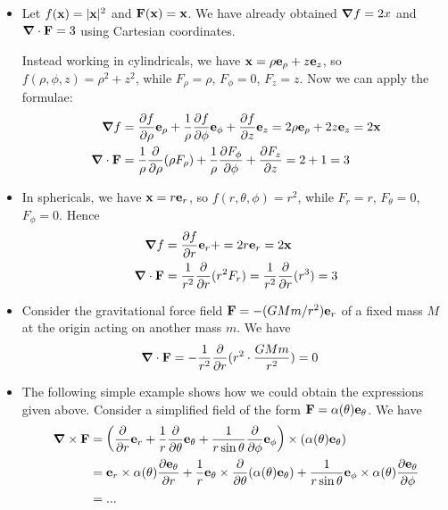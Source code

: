 \documentclass{../../template/note}
\begin{document}
    \begin{example*}
        \begin{itemize}
            \item Let \(f(\V x) = |\V x|^2\) and \(\V F(\V x) = \V x\). We have already obtained \(\grad f = 2x\) and \(\div \V F = 3\) using Cartesian coordinates.
            
            Instead working in cylindricals, we have \(\V x = \rho \V e_\rho + z \V e_z\), so \(f(\rho, \phi, z) = \rho^2 + z^2\), while \(F_\rho = \rho\), \(F_\phi = 0\), \(F_z = z\). Now we can apply the formulae:
            \begin{align*}
                \grad f &= \pd f \rho \V e_\rho + \frac 1 \rho \pd f \phi \V e_\phi + \pd f z \V e_z = 2\rho \V e_\rho + 2z \V e_z = 2\V x \\
                \div \V F &= \frac 1 \rho \pd{}\rho(\rho F_\rho) + \frac 1 \rho \pd{F_\phi}{\phi} + \pd{F_z}{z} = 2 + 1 = 3
            \end{align*}
            \item In sphericals, we have \(\V x = r \V e_r\), so \(f(r, \theta, \phi) = r^2\), while \(F_r = r\), \(F_\theta = 0\), \(F_\phi = 0\). Hence
            \begin{align*}
                \grad f &= \pd{f}{r} \V e_r + = 2r \V e_r = 2 \V x \\
                \div \V F &= \frac 1 {r^2} \pd{} r (r^2F_r) = \frac 1 {r^2} \pd{} r (r^3) = 3
            \end{align*}
            \item Consider the gravitational force field \(\V F = -(GMm/r^2)\V e_r\) of a fixed mass \(M\) at the origin acting on another mass \(m\). We have
            \begin{align*}
                \div \V F = -\frac 1 {r^2} \pd{} r (r^2 \cdot \frac{GMm}{r^2}) &= 0 
            \end{align*}
            \item The following simple example shows how we could obtain the expressions given above. Consider a simplified field of the form \(\V F = \alpha(\theta) \V e_\theta\). We have
            \begin{align*}
                \curl \V F &= \left(\pd{}{r} \V e_r + \frac 1 r \pd{}{\theta} \V e_\theta + \frac 1{r \sin \theta} \pd {} \phi \V e_\phi\right) \times (\alpha(\theta)\V e_\theta) \\
                &= \V e_r \times \alpha(\theta) \pd{\V e_\theta}{r} + \frac 1 r \V e_\theta \times \pd{} \theta (\alpha(\theta) \V e_\theta) + \frac 1 {r \sin \theta} \V e_\phi \times \alpha(\theta) \pd{\V e_\theta}{\phi} \\
                &= ...
            \end{align*}
        \end{itemize}
    \end{example*}
    
\end{document}
